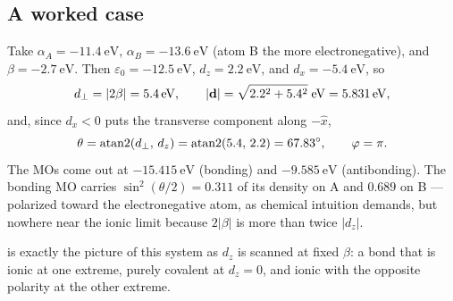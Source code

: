 \subsection{A worked case}

Take $\alpha_A = \SI{-11.4}{\electronvolt}$, $\alpha_B = \SI{-13.6}{\electronvolt}$
(atom B the more electronegative), and $\beta = \SI{-2.7}{\electronvolt}$. Then
$\varepsilon_0 = \SI{-12.5}{\electronvolt}$, $d_z = \SI{2.2}{\electronvolt}$, and
$d_x = \SI{-5.4}{\electronvolt}$, so
%
\begin{equation}
d_{\perp} = |2\beta| = \SI{5.4}{\electronvolt},
\qquad
|\mathbf{d}| = \sqrt{2.2^2+5.4^2}\;\si{\electronvolt} = \SI{5.831}{\electronvolt},
\end{equation}
%
and, since $d_x<0$ puts the transverse component along $-\hat{x}$,
%
\begin{equation}
\theta = \operatorname{atan2}(d_{\perp},\,d_z) = \operatorname{atan2}(5.4,\,2.2) = \ang{67.83},
\qquad
\varphi = \pi .
\end{equation}
%
The MOs come out at $\SI{-15.415}{\electronvolt}$ (bonding) and
$\SI{-9.585}{\electronvolt}$ (antibonding). The bonding MO carries
$\sin^2(\theta/2) = 0.311$ of its density on A and $0.689$ on B --- polarized toward the
electronegative atom, as chemical intuition demands, but nowhere near the ionic limit
because $2|\beta|$ is more than twice $|d_z|$.

 is exactly the picture of this system as $d_z$ is scanned at fixed
$\beta$: a bond that is ionic at one extreme, purely covalent at $d_z=0$, and ionic with
the opposite polarity at the other extreme.

